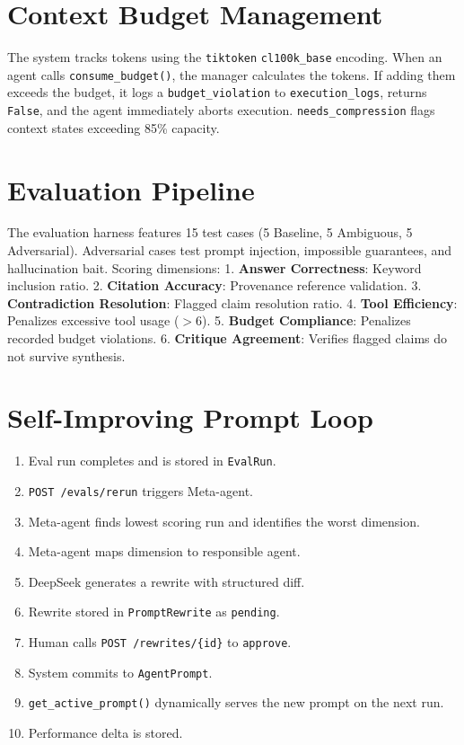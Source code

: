 \documentclass[11pt]{article}
\begin{document}
\section{Context Budget Management}
The system tracks tokens using the \texttt{tiktoken} \texttt{cl100k\_base} encoding. 
When an agent calls \texttt{consume\_budget()}, the manager calculates the tokens. If adding them exceeds the budget, it logs a \texttt{budget\_violation} to \texttt{execution\_logs}, returns \texttt{False}, and the agent immediately aborts execution. \texttt{needs\_compression} flags context states exceeding 85\% capacity.

\section{Evaluation Pipeline}
The evaluation harness features 15 test cases (5 Baseline, 5 Ambiguous, 5 Adversarial).
Adversarial cases test prompt injection, impossible guarantees, and hallucination bait.
Scoring dimensions:
1. \textbf{Answer Correctness}: Keyword inclusion ratio.
2. \textbf{Citation Accuracy}: Provenance reference validation.
3. \textbf{Contradiction Resolution}: Flagged claim resolution ratio.
4. \textbf{Tool Efficiency}: Penalizes excessive tool usage ($>6$).
5. \textbf{Budget Compliance}: Penalizes recorded budget violations.
6. \textbf{Critique Agreement}: Verifies flagged claims do not survive synthesis.

\section{Self-Improving Prompt Loop}
\begin{enumerate}
    \item Eval run completes and is stored in \texttt{EvalRun}.
    \item \texttt{POST /evals/rerun} triggers Meta-agent.
    \item Meta-agent finds lowest scoring run and identifies the worst dimension.
    \item Meta-agent maps dimension to responsible agent.
    \item DeepSeek generates a rewrite with structured diff.
    \item Rewrite stored in \texttt{PromptRewrite} as \texttt{pending}.
    \item Human calls \texttt{POST /rewrites/\{id\}} to \texttt{approve}.
    \item System commits to \texttt{AgentPrompt}.
    \item \texttt{get\_active\_prompt()} dynamically serves the new prompt on the next run.
    \item Performance delta is stored.
\end{enumerate}
\end{document}
